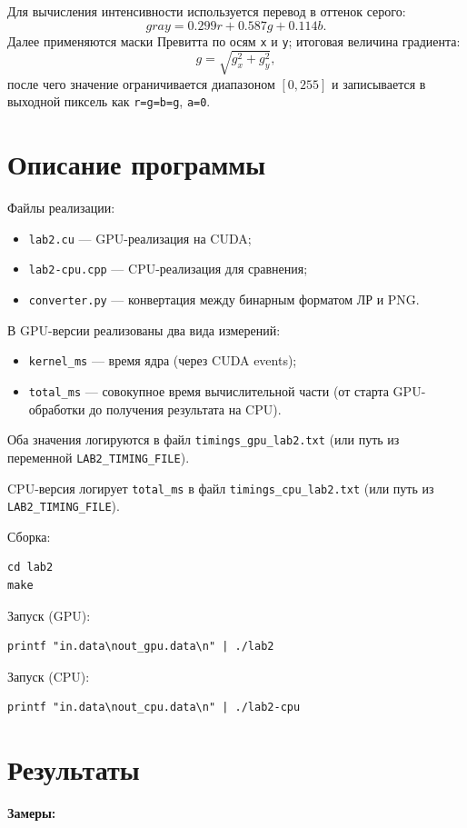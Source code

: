 \documentclass[a4paper,14pt]{extarticle}
\begin{document}
Для вычисления интенсивности используется перевод в оттенок серого:
\[
gray = 0.299r + 0.587g + 0.114b.
\]
Далее применяются маски Превитта по осям \texttt{x} и \texttt{y}; итоговая величина
градиента:
\[
g = \sqrt{g_x^2 + g_y^2},
\]
после чего значение ограничивается диапазоном \([0,255]\) и записывается в
выходной пиксель как \texttt{r=g=b=g}, \texttt{a=0}.

\section*{Описание программы}
Файлы реализации:
\begin{itemize}
    \item \texttt{lab2.cu} --- GPU-реализация на CUDA;
    \item \texttt{lab2-cpu.cpp} --- CPU-реализация для сравнения;
    \item \texttt{converter.py} --- конвертация между бинарным форматом ЛР и PNG.
\end{itemize}

В GPU-версии реализованы два вида измерений:
\begin{itemize}
    \item \texttt{kernel\_ms} --- время ядра (через CUDA events);
    \item \texttt{total\_ms} --- совокупное время вычислительной части
    (от старта GPU-обработки до получения результата на CPU).
\end{itemize}
Оба значения логируются в файл \texttt{timings\_gpu\_lab2.txt} (или путь из переменной
\texttt{LAB2\_TIMING\_FILE}).

CPU-версия логирует \texttt{total\_ms} в файл \texttt{timings\_cpu\_lab2.txt}
(или путь из \texttt{LAB2\_TIMING\_FILE}).

Сборка:
\begin{lstlisting}[style=cudastyle]
cd lab2
make
\end{lstlisting}

Запуск (GPU):
\begin{lstlisting}[style=cudastyle]
printf "in.data\nout_gpu.data\n" | ./lab2
\end{lstlisting}

Запуск (CPU):
\begin{lstlisting}[style=cudastyle]
printf "in.data\nout_cpu.data\n" | ./lab2-cpu
\end{lstlisting}

\section*{Результаты}
\textbf{Замеры:}
\end{document}

